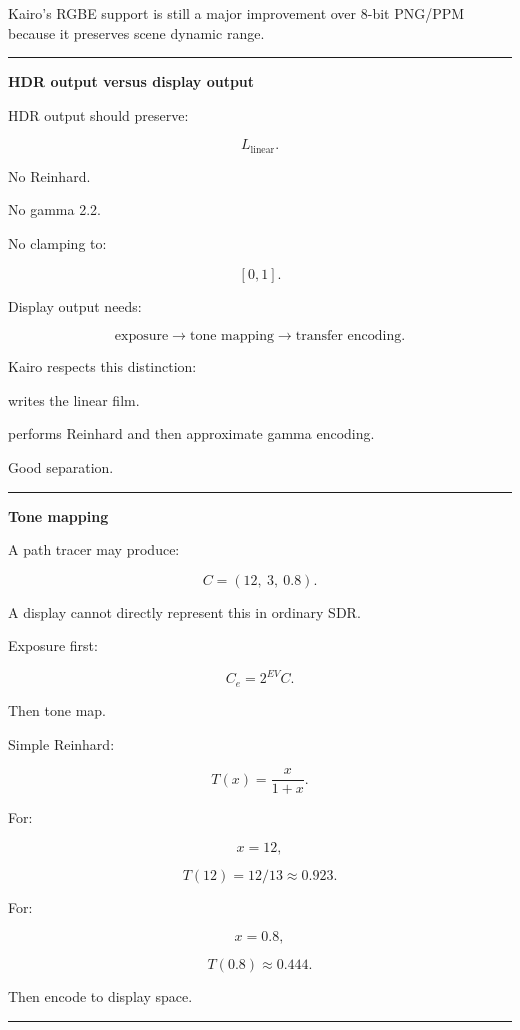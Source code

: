 Kairo's RGBE support is still a major improvement over 8-bit PNG/PPM because it preserves scene dynamic range.

\begin{center}\rule{0.5\linewidth}{0.5pt}\end{center}

\textbf{HDR output versus display output}

HDR output should preserve:

\[
L_{\text{linear}}.
\]

No Reinhard.

No gamma 2.2.

No clamping to:

\[
[0,1].
\]

Display output needs:

\[
\text{exposure}
\rightarrow
\text{tone mapping}
\rightarrow
\text{transfer encoding}.
\]

Kairo respects this distinction:

 writes the linear film.

 performs Reinhard and then approximate gamma encoding.

Good separation.

\begin{center}\rule{0.5\linewidth}{0.5pt}\end{center}

\textbf{Tone mapping}

A path tracer may produce:

\[
C=(12,\ 3,\ 0.8).
\]

A display cannot directly represent this in ordinary SDR.

Exposure first:

\[
\boxed{
C_e=
2^{EV}C.
}
\]

Then tone map.

Simple Reinhard:

\[
\boxed{
T(x)=\frac{x}{1+x}.
}
\]

For:

\[
x=12,
\]

\[
T(12)=12/13\approx0.923.
\]

For:

\[
x=0.8,
\]

\[
T(0.8)\approx0.444.
\]

Then encode to display space.

\begin{center}\rule{0.5\linewidth}{0.5pt}\end{center}

